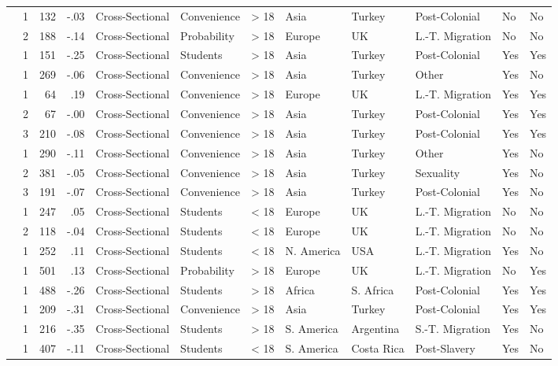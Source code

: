 \documentclass[10pt, letterpaper]{article}
\begin{document}
\begin{landscape}
\begin{xltabular}{650pt}{Xrrrllrlllll}
 \cite{2395} & 1 & 132 & -.03 & Cross-Sectional & Convenience & > 18 & Asia & Turkey & Post-Colonial & No & No\\
 & 2 & 188 & -.14 & Cross-Sectional & Probability & > 18 & Europe & UK & L.-T. Migration & No & No\\
\cite{322} & 1 & 151 & -.25 & Cross-Sectional & Students & > 18 & Asia & Turkey & Post-Colonial & Yes & Yes\\
\cite{2257} & 1 & 269 & -.06 & Cross-Sectional & Convenience & > 18 & Asia & Turkey & Other & Yes & No\\
\cite{423} & 1 & 64 & .19 & Cross-Sectional & Convenience & > 18 & Europe & UK & L.-T. Migration & Yes & Yes\\
 & 2 & 67 & -.00 & Cross-Sectional & Convenience & > 18 & Asia & Turkey & Post-Colonial & Yes & Yes\\
 & 3 & 210 & -.08 & Cross-Sectional & Convenience & > 18 & Asia & Turkey & Post-Colonial & Yes & Yes\\
\cite{2396} & 1 & 290 & -.11 & Cross-Sectional & Convenience & > 18 & Asia & Turkey & Other & Yes & No\\
 & 2 & 381 & -.05 & Cross-Sectional & Convenience & > 18 & Asia & Turkey & Sexuality & Yes & No\\
 & 3 & 191 & -.07 & Cross-Sectional & Convenience & > 18 & Asia & Turkey & Post-Colonial & Yes & No\\
\cite{2023} & 1 & 247 & .05 & Cross-Sectional & Students & < 18 & Europe & UK & L.-T. Migration & No & No\\
 & 2 & 118 & -.04 & Cross-Sectional & Students & < 18 & Europe & UK & L.-T. Migration & No & No\\
\cite{1045} & 1 & 252 & .11 & Cross-Sectional & Students & < 18 & N. America & USA & L.-T. Migration & Yes & No\\
\cite{2397} & 1 & 501 & .13 & Cross-Sectional & Probability & > 18 & Europe & UK & L.-T. Migration & No & Yes\\
\cite{284} & 1 & 488 & -.26 & Cross-Sectional & Students & > 18 & Africa & S. Africa & Post-Colonial & Yes & Yes\\
\cite{1248} & 1 & 209 & -.31 & Cross-Sectional & Convenience & > 18 & Asia & Turkey & Post-Colonial & Yes & Yes\\
\cite{1914} & 1 & 216 & -.35 & Cross-Sectional & Students & > 18 & S. America & Argentina & S.-T. Migration & Yes & No\\
\cite{480} & 1 & 407 & -.11 & Cross-Sectional & Students & < 18 & S. America & Costa Rica & Post-Slavery & Yes & No\\

\end{xltabular}
\end{landscape}
\end{document}
